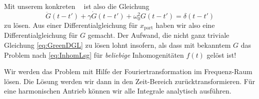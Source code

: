 \documentclass[paper=a4, fontsize=11.0pt, abstractoff, DIV12]{scrartcl}
\newcommand{\xinhom}{\ensuremath{x_\mathrm{part}}}
\DeclareMathOperator{\Dt}{\mathcal{D}_t}
\begin{document}
Mit unserem konkreten $\Dt$ ist also die Gleichung
\begin{equation}
\ddot{G}(t-t') + \gamma\dot{G}(t-t') + \omega_0^2 G(t-t') = \delta(t-t')
\label{eq:GreenDGL}
\end{equation}
zu lösen. Aus einer Differentialgleichung für $\xinhom$ haben wir also eine
Differentialgleichung für $G$ gemacht. Der Aufwand, die nicht ganz triviale
Gleichung \eqref{eq:GreenDGL} zu lösen lohnt insofern, als dass mit
bekanntem $G$ das Problem nach \eqref{eq:InhomLsg} für \emph{beliebige}
Inhomogenitäten $f(t)$ gelöst ist!

Wir werden das Problem mit Hilfe der Fouriertransformation im Frequenz-Raum
lösen. Die Lösung werden wir dann in den Zeit-Bereich zurücktransformieren. Für
eine harmonischen Antrieb können wir alle Integrale analytisch ausführen.
\end{document}
